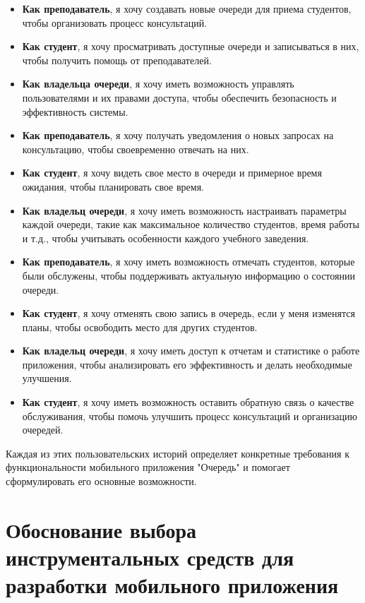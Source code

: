 \begin{itemize}
	\item \textbf{Как преподаватель}, я хочу создавать новые очереди
		для приема студентов, чтобы организовать процесс консультаций.
	\item \textbf{Как студент}, я хочу просматривать доступные очереди
		и записываться в них, чтобы получить помощь от преподавателей.
	\item \textbf{Как владельца очереди}, я хочу иметь возможность управлять
		пользователями и их правами доступа, чтобы обеспечить безопасность
		и эффективность системы.
	\item \textbf{Как преподаватель}, я хочу получать уведомления
		о новых запросах на консультацию, чтобы своевременно отвечать на них.
	\item \textbf{Как студент}, я хочу видеть свое место в очереди
		и примерное время ожидания, чтобы планировать свое время.
	\item \textbf{Как владельц очереди}, я хочу иметь возможность настраивать
		параметры каждой очереди, такие как максимальное количество студентов,
		время работы и т.д.,
		чтобы учитывать особенности каждого учебного заведения.
	\item \textbf{Как преподаватель}, я хочу иметь возможность отмечать
		студентов, которые были обслужены,
		чтобы поддерживать актуальную информацию о состоянии очереди.
	\item \textbf{Как студент}, я хочу отменять свою запись в очередь,
		если у меня изменятся планы,
		чтобы освободить место для других студентов.
	\item \textbf{Как владельц очереди}, я хочу иметь доступ к отчетам
		и статистике о работе приложения,
		чтобы анализировать его эффективность и делать необходимые улучшения.
	\item \textbf{Как студент}, я хочу иметь возможность оставить обратную
		связь о качестве обслуживания,
		чтобы помочь улучшить процесс консультаций и организацию очередей.
\end{itemize}

Каждая из этих пользовательских историй определяет конкретные требования
к функциональности мобильного приложения "Очередь"
и помогает сформулировать его основные возможности.

\section{Обоснование выбора инструментальных средств
для разработки мобильного приложения}

